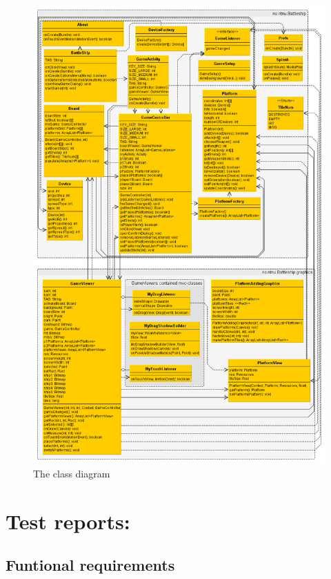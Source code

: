 \documentclass[12pt, a4paper]{article}
\begin{document}
\begin{figure}[h!]
    \centering
    \includegraphics[width=\textwidth]{classdiagram} 
    \caption{The class diagram}
    \label{fig:classdiagram}
\end{figure}

\section{Test reports:}
\subsection{Funtional requirements}
\end{document}
